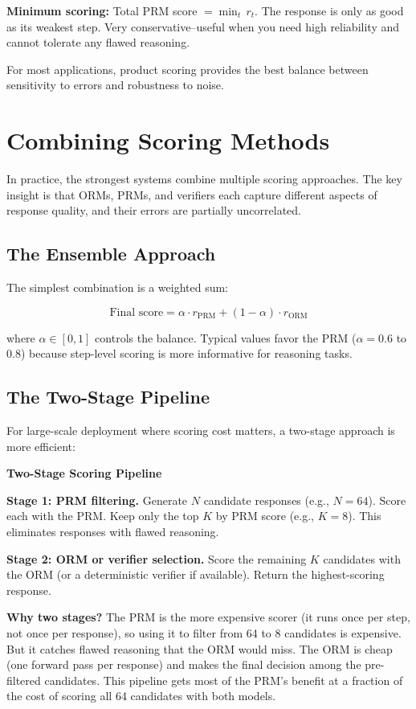\begin{chapterenv}
\begin{infobox}
\textbf{Minimum scoring:} Total PRM score $= \min_t\, r_t$. The response is only as good as its weakest step. Very conservative--useful when you need high reliability and cannot tolerate any flawed reasoning.

For most applications, product scoring provides the best balance between sensitivity to errors and robustness to noise.
\end{infobox}

\section{Combining Scoring Methods}

In practice, the strongest systems combine multiple scoring approaches. The key insight is that ORMs, PRMs, and verifiers each capture different aspects of response quality, and their errors are partially uncorrelated.

\subsection{The Ensemble Approach}

The simplest combination is a weighted sum:

$$\text{Final score} = \alpha \cdot r_{\text{PRM}} + (1 - \alpha) \cdot r_{\text{ORM}}$$

where $\alpha \in [0, 1]$ controls the balance. Typical values favor the PRM ($\alpha = 0.6$ to $0.8$) because step-level scoring is more informative for reasoning tasks.

\subsection{The Two-Stage Pipeline}

For large-scale deployment where scoring cost matters, a two-stage approach is more efficient:

\begin{infobox}
\textbf{Two-Stage Scoring Pipeline}

\textbf{Stage 1: PRM filtering.} Generate $N$ candidate responses (e.g., $N = 64$). Score each with the PRM. Keep only the top $K$ by PRM score (e.g., $K = 8$). This eliminates responses with flawed reasoning.

\textbf{Stage 2: ORM or verifier selection.} Score the remaining $K$ candidates with the ORM (or a deterministic verifier if available). Return the highest-scoring response.

\textbf{Why two stages?} The PRM is the more expensive scorer (it runs once per step, not once per response), so using it to filter from 64 to 8 candidates is expensive. But it catches flawed reasoning that the ORM would miss. The ORM is cheap (one forward pass per response) and makes the final decision among the pre-filtered candidates. This pipeline gets most of the PRM's benefit at a fraction of the cost of scoring all 64 candidates with both models.
\end{infobox}


\end{chapterenv}
